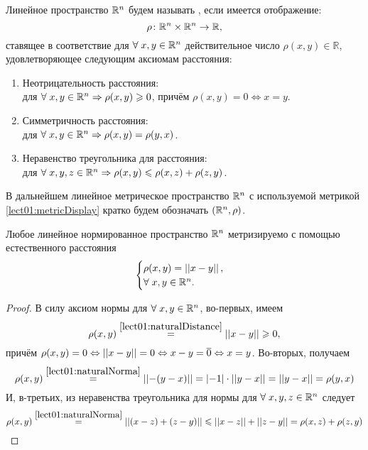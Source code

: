 Линейное пространство $ \mathbb{R}^n $ будем называть , если имеется отображение:
\begin{equation}
    \label{lect01:metricDisplay}
	\rho \colon \mathbb{R}^n \times \mathbb{R}^n \rightarrow \mathbb{R},
\end{equation}
ставящее в соответствие для $ \forall \; x, y \in \mathbb{R}^n $ действительное число $ \rho(x,y) \in \mathbb{R} $, удовлетворяющее следующим аксиомам расстояния:
\begin{enumerate}
    \item {Неотрицательность расстояния}:\\
    для $\forall \; x, y \in \mathbb{R}^n \Rightarrow \rho (x, y) \geqslant 0 $, причём $ \rho (x, y) = 0  \Leftrightarrow x = y $.
    \item {Симметричность расстояния}:\\
    для $\forall \; x, y \in \mathbb{R}^n \Rightarrow \rho (x, y) =  \rho (y, x)$.
    \item {Неравенство треугольника для расстояния}:\\
    для $\forall \; x, y, z \in \mathbb{R}^n \Rightarrow \rho (x, y) \leqslant \rho(x, z) + \rho (z, y)$.
\end{enumerate}

В дальнейшем линейное метрическое пространство $ \mathbb{R}^n $ с используемой метрикой \eqref{lect01:metricDisplay} кратко будем обозначать $ (\mathbb{R}^n, \rho) $.

\begin{theorem}
	Любое линейное нормированное пространство $ \mathbb{R}^n $ метризируемо с помощью естественного расстояния
    \begin{equation}
        \label{lect01:naturalDistance}
        \begin{cases}
        	\rho (x, y) = \left\lvert\left\lvert x-y\right\rvert\right\rvert, \\
            \forall \; x, y \in \mathbb{R}^n.
        \end{cases}
    \end{equation}
\end{theorem}
\begin{proof}
    В силу аксиом нормы для $ \forall \; x, y \in \mathbb{R}^n $, во-первых, имеем
    \begin{equation*}
    	\rho(x, y) \overset{\eqref{lect01:naturalDistance}}{=} \left\lvert\left\lvert x-y\right\rvert\right\rvert \geqslant 0,
    \end{equation*}
    причём $ \rho(x,y)=0 \Leftrightarrow \left\lvert\left\lvert x-y\right\rvert\right\rvert = 0 \Leftrightarrow x-y = \overline{0} \Leftrightarrow x = y $. Во-вторых, получаем 
    \begin{equation*}
    	\rho(x,y) \overset{\eqref{lect01:naturalNorma}}{=} \left\lvert\left\lvert-(y-x)\right\rvert\right\rvert = \left\lvert -1 \right\rvert \cdot \left\lvert\left\lvert y-x\right\rvert\right\rvert = \left\lvert\left\lvert y-x\right\rvert\right\rvert = \rho(y, x)
    \end{equation*}
    И, в-третьих, из неравенства треугольника для нормы для $ \forall \; x,y,z \in \mathbb{R}^n $ следует
    \begin{equation*}
    	\rho(x, y) \overset{\eqref{lect01:naturalNorma}}{=} \left\lvert\left\lvert(x-z) + (z-y)\right\rvert\right\rvert \leqslant \left\lvert\left\lvert x-z\right\rvert\right\rvert + \left\lvert\left\lvert z-y\right\rvert\right\rvert = \rho(x,z) + \rho(z, y)
    \end{equation*}
\end{proof}

